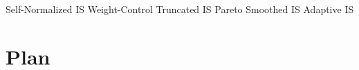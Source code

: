 \documentclass{article}   	%
\begin{document}
\begin{outline}
    \1 Self-Normalized IS
    \1 Weight-Control
        \2 Truncated IS
        \2 Pareto Smoothed IS
    \1 Adaptive IS
        \2 \citet{Aky21}

    
\end{outline}


\section{Plan}





\end{document}
